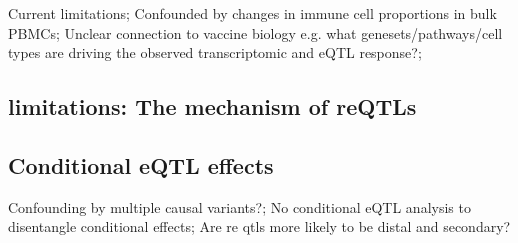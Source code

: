 Current limitations;
Confounded by changes in immune cell proportions in bulk PBMCs;
Unclear connection to vaccine biology e.g. what genesets/pathways/cell types are driving the observed transcriptomic and eQTL response?;

\subsection{limitations: The mechanism of reQTLs}

\subsection{Conditional eQTL effects}
Confounding by multiple causal variants?;
No conditional eQTL analysis to disentangle conditional effects;
Are re qtls more likely to be distal and secondary?

